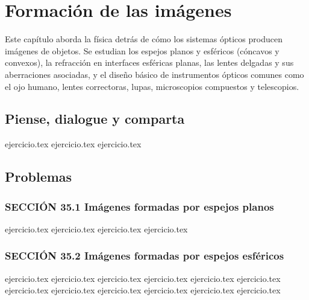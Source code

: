 \chapter{Formación de las imágenes}
\label{cap:formacion_de_las_imagenes}

Este capítulo aborda la física detrás de cómo los sistemas ópticos producen imágenes de objetos. Se estudian los espejos planos y esféricos (cóncavos y convexos), la refracción en interfaces esféricas planas, las lentes delgadas y sus aberraciones asociadas, y el diseño básico de instrumentos ópticos comunes como el ojo humano, lentes correctoras, lupas, microscopios compuestos y telescopios.

\section*{Piense, dialogue y comparta}
\begin{enumerate}
    {ejercicio.tex}
    {ejercicio.tex}
    {ejercicio.tex}
\end{enumerate}

\section*{Problemas}

\subsection*{SECCIÓN 35.1 Imágenes formadas por espejos planos}
\begin{enumerate}
    {ejercicio.tex}
    {ejercicio.tex}
    {ejercicio.tex}
    {ejercicio.tex}
\end{enumerate}

\subsection*{SECCIÓN 35.2 Imágenes formadas por espejos esféricos}
\begin{enumerate}
    \setcounter{enumi}{4}
    {ejercicio.tex}
    {ejercicio.tex}
    {ejercicio.tex}
    {ejercicio.tex}
    {ejercicio.tex}
    {ejercicio.tex}
    {ejercicio.tex}
    {ejercicio.tex}
    {ejercicio.tex}
    {ejercicio.tex}
    {ejercicio.tex}
    {ejercicio.tex}
\end{enumerate}

